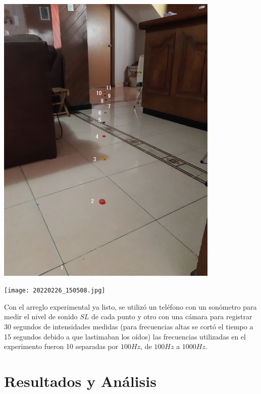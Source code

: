 \documentclass[DIV=calc, paper=a4, fontsize=11pt]{scrartcl}
\newenvironment{Figura}
  {\par\medskip\noindent\minipage{\linewidth}}
  {\endminipage\par\medskip}
\begin{document}
\begin{multicols}{2}
\begin{Figura}
\centering
    \includegraphics[width=0.8\textwidth]{20220226_145231.jpg}
    \label{fig}
\end{Figura}

\begin{Figura}
\centering
    \texttt{[image: 20220226\_150508.jpg]}
    \label{fig}
\end{Figura}

Con el arreglo experimental ya listo, se utilizó un teléfono con un sonómetro para medir el nivel de sonido $SL$ de cada punto y otro con una cámara para registrar 30 segundos de intensidades medidas (para frecuencias altas se cortó el tiempo a 15 segundos debido a que lastimaban los oídos) las frecuencias utilizadas en el experimento fueron 10 separadas por $100Hz$, de $100 Hz$ a $1000 Hz$. 



\section*{Resultados y Análisis}


\end{multicols}
\end{document}
